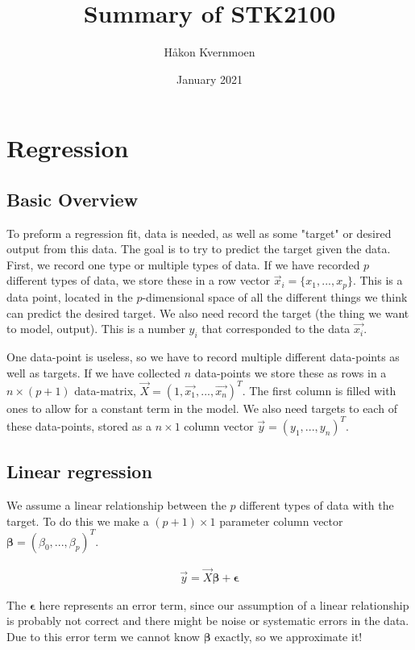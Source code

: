 \documentclass{article}
\title{Summary of STK2100}
\author{Håkon Kvernmoen}
\date{January 2021}
\newcommand{\vecsym}[1]{\boldsymbol{#1}} %
\begin{document}
\maketitle

\section{Regression}
\subsection{Basic Overview}
To preform a regression fit, data is needed, as well as some "target" or desired output from this data. The goal is to try to predict the target given the data. First, we record one type or multiple types of data. If we have recorded $p$ different types of data, we store these in a row vector $\Vec{x}_i = \{ x_1, ... , x_p \}$. This is a data point, located in the $p$-dimensional space of all the different things we think can predict the desired target. We also need record the target (the thing we want to model, output). This is a number $y_i$ that corresponded to the data $\Vec{x_i}$. 

One data-point is useless, so we have to record multiple different data-points as well as targets. If we have collected $n$ data-points we store these as rows in a $n \times (p+1)$ data-matrix, $\Vec{X} = (1, \Vec{x_1}, ... , \Vec{x_n})^T$. The first column is filled with ones to allow for a constant term in the model. We also need targets to each of these data-points, stored as a $n \times 1$ column vector $\Vec{y} = (y_1 , ... , y_n)^T$. 

\subsection{Linear regression}

We assume a linear relationship between the $p$ different types of data with the target. To do this we make a $(p+1) \times 1$ parameter column vector $\vecsym{\beta} = (\beta_0 , ... , \beta_p)^T$.

\begin{align*}
    \Vec{y} = \Vec{X}\vecsym{\beta} + \vecsym{\epsilon}
\end{align*}

The $\vecsym{\epsilon}$ here represents an error term, since our assumption  of a linear relationship is probably not correct and there might be noise or systematic errors in the data. Due to this error term we cannot know $\vecsym{\beta}$ exactly, so we approximate it!
\end{document}
